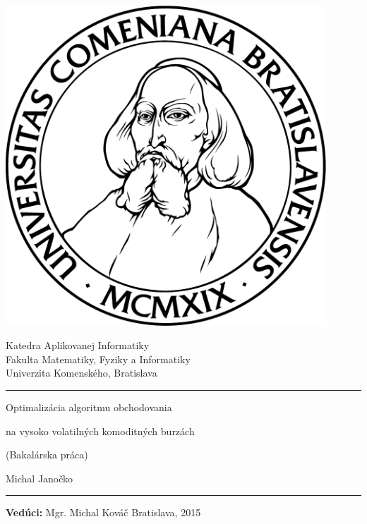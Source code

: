\documentclass[12pt]{book}
\def\mftitle{Optimalizácia algoritmu obchodovania}
\def\mftitles{na vysoko volatilných komoditných burzách}
\def\mfthesistype{Bakalárska práca}
\def\mfauthor{Michal Janočko}
\def\mfadvisor{Mgr. Michal Kováč}
\def\mfplacedate{Bratislava, 2015}
\begin{document}
\frontmatter

\thispagestyle{empty}

\noindent
\begin{minipage}{0.20\textwidth}
\includegraphics[width=0.9\textwidth]{komlogo-new}
\end{minipage}
\begin{minipage}{0.79\textwidth}
\begin{center}
\sc Katedra Aplikovanej Informatiky \\
Fakulta Matematiky, Fyziky a Informatiky \\
Univerzita Komenského, Bratislava
\end{center}
\end{minipage}

\vfill
\begin{center}
\begin{minipage}{0.8\textwidth}
\hrule
\bigskip\bigskip
\centerline{\LARGE\sc\mftitle}
\centerline{\LARGE\sc\mftitles}
\smallskip
\centerline{(\mfthesistype)}
\bigskip
\bigskip
\centerline{\large\sc\mfauthor}
\bigskip\bigskip
\hrule
\end{minipage}
\end{center}
\vfill
{\bf Vedúci:} \mfadvisor
\hfill\mfplacedate
\eject %

\thispagestyle{empty}~\vfill\eject %

{~}\vspace{12cm}
\end{document}
